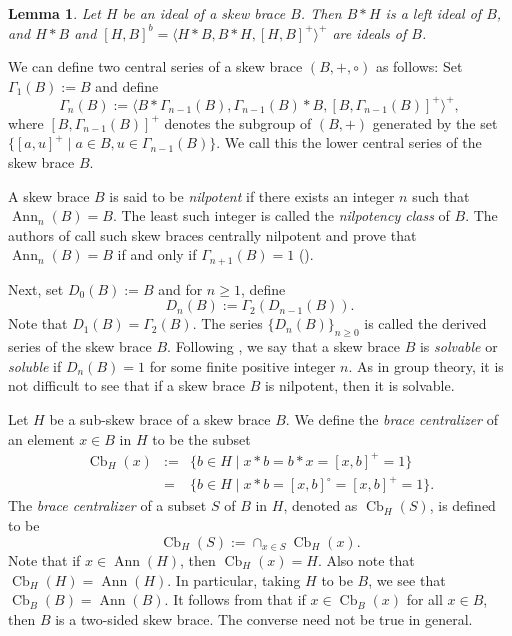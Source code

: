 \documentclass[10pt,a4paper]{amsart}
\numberwithin{equation}{section}
\newtheorem{lemma}[equation]{Lemma}
\newcommand{\Cb}{\operatorname{Cb} }
\newcommand{\Ann}{\operatorname{Ann} }
\begin{document}
 \begin{lemma}
 Let $H$ be an ideal  of a skew brace $B$.  Then $B*H$ is a left ideal of $B$, and  $H*B$ and $[H, B]^b = \langle H*B, B*H, [H, B]^+\rangle^+$ are  ideals of $B$.
 \end{lemma}

 We can define two central series of a skew brace $(B, +, \circ)$ as follows:  Set $\Gamma_1(B)  := B$ and define
$$\Gamma_n(B) := \langle B * \Gamma_{n-1}(B), \Gamma_{n-1}(B) * B, [B, \Gamma_{n-1}(B)]^{+}\rangle^{+},$$
where $[B, \Gamma_{n-1}(B)]^{+}$ denotes the subgroup of $(B, +)$ generated by the set $\{[a, u]^{+} \mid a \in B, u \in \Gamma_{n-1}(B)\}$. We call this the lower central series of the skew brace $B$.

A skew brace $B$ is said to be  {\em nilpotent} if there exists an integer $n$ such that  $\Ann_n(B) = B$. The least such integer is called the  {\em nilpotency class} of $B$.  The authors of \cite{BJ23} call such skew braces centrally nilpotent and prove that   $\Ann_n(B) = B$ if and only if $\Gamma_{n+1}(B) = 1$ (\cite[Theorem 2.8]{BJ23}). 
 
Next, set $D_0(B) := B$ and for $n \geqslant 1$, define 
$$D_n(B):= \Gamma_2(D_{n-1}(B)).$$
Note that $D_1(B) = \Gamma_2(B)$. The series $\{D_n(B)\}_{n\geqslant 0}$ is called the derived series of the skew brace $B$. Following \cite{BEJP24}, we say that a skew brace $B$ is {\em solvable} or {\em soluble} if $D_n(B) = 1$ for some finite positive integer $n$. As in group theory, it is not difficult to see that if a skew brace $B$ is nilpotent, then it is solvable. 

Let $H$ be a sub-skew brace of a skew brace $B$. We define the  \emph{brace centralizer} of an element $x \in B$ in $H$ to be the subset 
\begin{eqnarray*}
\Cb_H(x) &:=&  \{b \in H \mid x * b = b * x = [x, b]^{+} = 1\}\\
&= &\{b \in H \mid x * b = [x, b]^{\circ} = [x, b]^{+} = 1\}.
\end{eqnarray*}
The {\it brace centralizer}  of a subset  $S$ of $B$ in $H$, denoted as $\Cb_{H}(S)$, is defined to be
$$\Cb_{H}(S) := \cap_{x \in S} \Cb_H(x).$$
 Note that if $x \in \Ann(H)$, then $\Cb_{H}(x) = H$. Also note that $\Cb_{H}(H) = \Ann(H)$. In particular, taking $H$ to be $B$, we see that $\Cb_{B}(B) = \Ann(B)$. It follows from \cite[Proposition 2.19]{SV18} that if $x \in \Cb_{B}(x)$ for all $x \in B$, then $B$ is a two-sided skew brace. The converse need not be true in general. 
\end{document}
